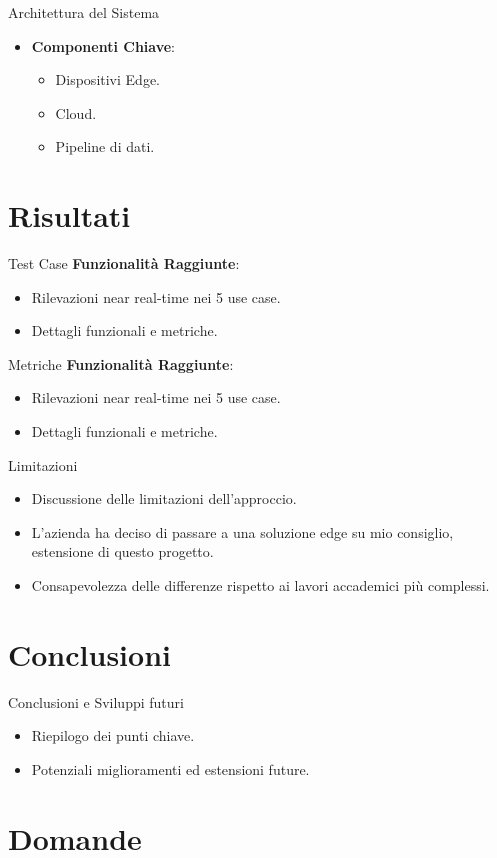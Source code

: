 \documentclass{beamer}
\begin{document}
\begin{frame}{Architettura del Sistema}
\begin{itemize}
    \item \textbf{Componenti Chiave}:
    \begin{itemize}
        \item Dispositivi Edge.
        \item Cloud.
        \item Pipeline di dati.
    \end{itemize}
\end{itemize}
\end{frame}

\section{Risultati}

\begin{frame}{Test Case}
\textbf{Funzionalità Raggiunte}:
\begin{itemize}
    \item Rilevazioni near real-time nei 5 use case.
    \item Dettagli funzionali e metriche.
\end{itemize}
\end{frame}

\begin{frame}{Metriche}
\textbf{Funzionalità Raggiunte}:
\begin{itemize}
    \item Rilevazioni near real-time nei 5 use case.
    \item Dettagli funzionali e metriche.
\end{itemize}
\end{frame}

\begin{frame}{Limitazioni}
\begin{itemize}
    \item Discussione delle limitazioni dell'approccio.
    \item L'azienda ha deciso di passare a una soluzione edge su mio consiglio, estensione di questo progetto.
    \item Consapevolezza delle differenze rispetto ai lavori accademici più complessi.
\end{itemize}
\end{frame}

\section{Conclusioni}

\begin{frame}{Conclusioni e Sviluppi futuri}
\begin{itemize}
    \item Riepilogo dei punti chiave.
    \item Potenziali miglioramenti ed estensioni future.
\end{itemize}
\end{frame}

\section*{Domande}

\backmatter
\end{document}
